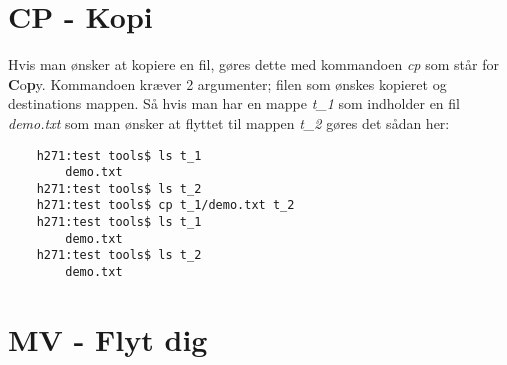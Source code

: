 \section{CP - Kopi}
Hvis man ønsker at kopiere en fil, gøres dette med kommandoen \textit{cp} som står for \textbf{C}o\textbf{p}y. Kommandoen kræver 2 argumenter; filen som ønskes kopieret og destinations mappen. Så hvis man har en mappe \textit{t\_1} som indholder en fil \textit{demo.txt} som man ønsker at flyttet til mappen \textit{t\_2} gøres det sådan her:
\begin{lstlisting}
	h271:test tools$ ls t_1
        demo.txt
	h271:test tools$ ls t_2
	h271:test tools$ cp t_1/demo.txt t_2
	h271:test tools$ ls t_1
        demo.txt
	h271:test tools$ ls t_2
        demo.txt
\end{lstlisting}
\section{MV - Flyt dig}
